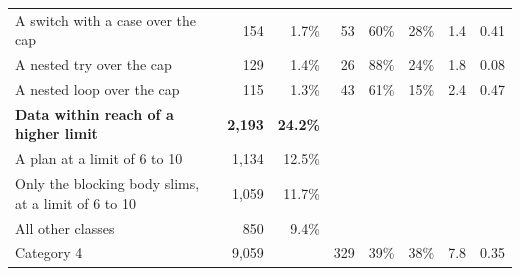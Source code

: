 \begin{tabular}{>{\raggedright\arraybackslash}p{6.6cm}rrrrrrr}
\quad A switch with a case over the cap & 154 & 1.7\% & 53 & 60\% & 28\% & 1.4 & 0.41 \\
\quad A nested try over the cap & 129 & 1.4\% & 26 & 88\% & 24\% & 1.8 & 0.08 \\
\quad A nested loop over the cap & 115 & 1.3\% & 43 & 61\% & 15\% & 2.4 & 0.47 \\
\textbf{Data within reach of a higher limit} & \textbf{2{,}193} & \textbf{24.2\%} & & & & & \\
\quad A plan at a limit of 6 to 10 & 1{,}134 & 12.5\% & & & & & \\
\quad Only the blocking body slims, at a limit of 6 to 10 & 1{,}059 & 11.7\% & & & & & \\
All other classes & 850 & 9.4\% & & & & & \\
\midrule
Category 4 & 9{,}059 & & 329 & 39\% & 38\% & 7.8 & 0.35 \\
\bottomrule
\end{tabular}
